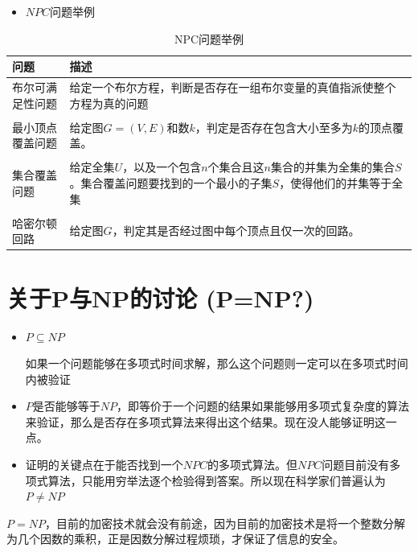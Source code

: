 \begin{itemize}
	\item $NPC$问题举例
\end{itemize}	

	\begin{table}[!htbp]
		\centering
		\caption{NPC问题举例}
		\begin{tabular}{p{100pt}p{200pt}}
			\toprule[0.5mm]
			问题 & 描述\\
			\midrule[0.4mm]
			布尔可满足性问题&给定一个布尔方程，判断是否存在一组布尔变量的真值指派使整个方程为真的问题\\ \\
			最小顶点覆盖问题&给定图$G=(V,E)$和数$k$，判定是否存在包含大小至多为$k$的顶点覆盖。\\ \\
			集合覆盖问题&给定全集$U$，以及一个包含$n$个集合且这$n$集合的并集为全集的集合$S$。集合覆盖问题要找到的一个最小的子集$S$，使得他们的并集等于全集\\ \\
			哈密尔顿回路&给定图$G$，判定其是否经过图中每个顶点且仅一次的回路。\\
			\bottomrule
		\end{tabular}
	\end{table}
\section{关于P与NP的讨论 (P=NP?)}

\begin{itemize}
	\item$P\subseteq NP$
	
如果一个问题能够在多项式时间求解，那么这个问题则一定可以在多项式时间内被验证
\end{itemize}
\begin{itemize}
	\item $P$是否能够等于$NP$，即等价于一个问题的结果如果能够用多项式复杂度的算法来验证，那么是否存在多项式算法来得出这个结果。现在没人能够证明这一点。
\end{itemize}
\begin{itemize}
	\item 证明的关键点在于能否找到一个$NPC$的多项式算法。但$NPC$问题目前没有多项式算法，只能用穷举法逐个检验得到答案。所以现在科学家们普遍认为$P\neq NP$
\end{itemize}
\begin{itemize}
	$P= NP$，目前的加密技术就会没有前途，因为目前的加密技术是将一个整数分解为几个因数的乘积，正是因数分解过程烦琐，才保证了信息的安全。
\end{itemize}
	
